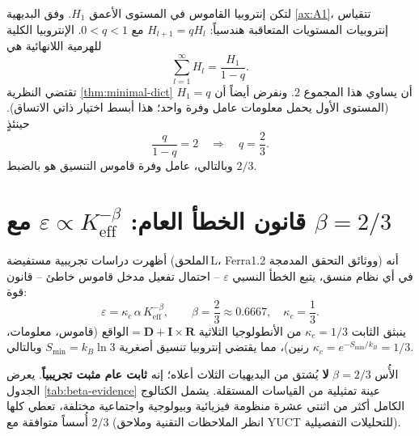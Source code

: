 \documentclass[12pt,a4paper]{article}
\begin{document}
	لتكن إنتروبيا القاموس في المستوى الأعمق \(H_1\). وفق البديهية \ref{ax:A1}، تتقياس إنتروبيات المستويات المتعاقبة هندسياً: \(H_{l+1} = q H_l\) مع \(0 < q < 1\). الإنتروبيا الكلية للهرمية اللانهائية هي
	\[
	\sum_{l=1}^{\infty} H_l = \frac{H_1}{1-q}.
	\]
	تقتضي النظرية \ref{thm:minimal-dict} أن يساوي هذا المجموع \(2\). ونفرض أيضاً أن \(H_1 = q\) (المستوى الأول يحمل معلومات عامل وفرة واحد؛ هذا أبسط اختيار ذاتي الاتساق). حينئذٍ
	\begin{equation}
		\frac{q}{1-q} = 2 \quad\Longrightarrow\quad \boxed{q = \frac{2}{3}}.
		\label{eq:q}
	\end{equation}
	وبالتالي، عامل وفرة قاموس التنسيق هو بالضبط \(2/3\).
	
	\section{قانون الخطأ العام: \(\varepsilon \propto K_{\mathrm{eff}}^{-\beta}\) مع \(\beta = 2/3\)}
	
	أظهرت دراسات تجريبية مستفيضة (الملحق L، Ferra1.2 ووثائق التحقق المدمجة) أنه في أي نظام منسق، يتبع الخطأ النسبي \(\varepsilon\) – احتمال تفعيل مدخل قاموس خاطئ – قانون قوة:
	\begin{equation}
		\boxed{\varepsilon = \kappa_c \, \alpha \, K_{\mathrm{eff}}^{-\beta}, \qquad \beta = \frac{2}{3} \approx 0.6667,\quad \kappa_c = \frac{1}{3}}.
		\label{eq:error-law}
	\end{equation}
	ينبثق الثابت \(\kappa_c = 1/3\) من الأنطولوجيا الثلاثية \(\text{الواقع} = \mathbf{D} + \mathbf{I} \times \mathbf{R}\) (قاموس، معلومات، رنين)، مما يقتضي إنتروبيا تنسيق أصغرية \(S_{\min} = k_B \ln 3\) وبالتالي \(\kappa_c = e^{-S_{\min}/k_B} = 1/3\).
	
	الأُس \(\beta = 2/3\) \textbf{لا} يُشتق من البديهيات الثلاث أعلاه؛ إنه \textbf{ثابت عام مثبت تجريبياً}. يعرض الجدول \ref{tab:beta-evidence} عينة تمثيلية من القياسات المستقلة. يشمل الكتالوج الكامل أكثر من اثنتي عشرة منظومة فيزيائية وبيولوجية واجتماعية مختلفة، تعطي كلها أُسساً متوافقة مع \(2/3\) (انظر الملاحظات التقنية وملاحق YUCT للتحليلات التفصيلية).
	
\end{document}
